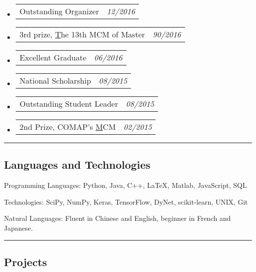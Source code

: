 \documentclass[10pt,letterpaper]{article}
\makeatletter
\newenvironment{indentsection}[1]%
{\begin{list}{}%
	{\setlength{\leftmargin}{#1}}%
	\item[]%
}
{\end{list}}
\newcommand{\headerrow}[2]
{\begin{tabular*}{\linewidth}{l@{\extracolsep{\fill}}r}
	#1 &
	#2 \\
\end{tabular*}}
\makeatother
\begin{document}
\begin{itemize}
	\parskip=0.1em
	
	\item 
	\headerrow
		{Outstanding Organizer}
		{\emph{12/2016}}
	\item 
	\headerrow
		{3rd prize, \href{http://gmcm.seu.edu.cn/}The 13th MCM of Master}
		{\emph{90/2016}}
	\item 
	\headerrow
		{Excellent Graduate}
		{\emph{06/2016}}
	\item 
	\headerrow
		{National Scholarship}
		{\emph{08/2015}}	
	\item 
	\headerrow
		{Outstanding Student Leader}
		{\emph{08/2015}}
	\item 
	\headerrow
		{2nd Prize, COMAP's \href{https://www.comap.com/undergraduate/contests/}MCM}
		{\emph{02/2015}}
\end{itemize}

\hrule
\vspace{-0.4em}
\subsection*{Languages and Technologies}

\begin{indentsection}{\parindent}
\begin{description*}
	\item[Programming Languages:]
	Python, Java, C++, \LaTeX, Matlab, JavaScript, SQL
	\item[Technologies:]
	SciPy, NumPy, Keras, TensorFlow, DyNet, scikit-learn, UNIX, Git
	\item[Natural Languages:]
	Fluent in Chinese and English, beginner in French and Japanese.
\end{description*}
\end{indentsection}

\hrule
\vspace{-0.4em}
\subsection*{Projects}
\end{document}
